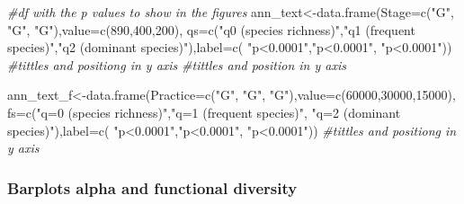\documentclass[]{interact}
\theoremstyle{plain}%
\theoremstyle{definition}
\theoremstyle{remark}
\newenvironment{Shaded}{\begin{snugshade}}{\end{snugshade}}
\newcommand{\AttributeTok}[1]{\textcolor[rgb]{0.77,0.63,0.00}{#1}}
\newcommand{\CommentTok}[1]{\textcolor[rgb]{0.56,0.35,0.01}{\textit{#1}}}
\newcommand{\DecValTok}[1]{\textcolor[rgb]{0.00,0.00,0.81}{#1}}
\newcommand{\FunctionTok}[1]{\textcolor[rgb]{0.00,0.00,0.00}{#1}}
\newcommand{\NormalTok}[1]{#1}
\newcommand{\OtherTok}[1]{\textcolor[rgb]{0.56,0.35,0.01}{#1}}
\newcommand{\StringTok}[1]{\textcolor[rgb]{0.31,0.60,0.02}{#1}}
\begin{document}
\begin{Shaded}
\begin{Highlighting}[]
\CommentTok{\#df with the p values to show in the figures}
\NormalTok{ann\_text}\OtherTok{\textless{}{-}}\FunctionTok{data.frame}\NormalTok{(}\AttributeTok{Stage=}\FunctionTok{c}\NormalTok{(}\StringTok{"G"}\NormalTok{, }\StringTok{"G"}\NormalTok{, }\StringTok{"G"}\NormalTok{),}\AttributeTok{value=}\FunctionTok{c}\NormalTok{(}\DecValTok{890}\NormalTok{,}\DecValTok{400}\NormalTok{,}\DecValTok{200}\NormalTok{),}
     \AttributeTok{qs=}\FunctionTok{c}\NormalTok{(}\StringTok{"q0 (species richness)"}\NormalTok{,}\StringTok{"q1 (frequent species)"}\NormalTok{,}\StringTok{"q2 (dominant species)"}\NormalTok{),}\AttributeTok{label=}\FunctionTok{c}\NormalTok{(}
       \StringTok{"p\textless{}0.0001"}\NormalTok{,}\StringTok{"p\textless{}0.0001"}\NormalTok{, }\StringTok{"p\textless{}0.0001"}\NormalTok{)) }\CommentTok{\#tittles and positiong in y axis}
\CommentTok{\#tittles and position in y axis}


\NormalTok{ann\_text\_f}\OtherTok{\textless{}{-}}\FunctionTok{data.frame}\NormalTok{(}\AttributeTok{Practice=}\FunctionTok{c}\NormalTok{(}\StringTok{"G"}\NormalTok{, }\StringTok{"G"}\NormalTok{, }\StringTok{"G"}\NormalTok{),}\AttributeTok{value=}\FunctionTok{c}\NormalTok{(}\DecValTok{60000}\NormalTok{,}\DecValTok{30000}\NormalTok{,}\DecValTok{15000}\NormalTok{),}
                       \AttributeTok{fs=}\FunctionTok{c}\NormalTok{(}\StringTok{"q=0 (species richness)"}\NormalTok{,}\StringTok{"q=1 (frequent species)"}\NormalTok{,}
                            \StringTok{"q=2 (dominant species)"}\NormalTok{),}\AttributeTok{label=}\FunctionTok{c}\NormalTok{(}
                              \StringTok{"p\textless{}0.0001"}\NormalTok{,}\StringTok{"p\textless{}0.0001"}\NormalTok{, }\StringTok{"p\textless{}0.0001"}\NormalTok{))}
\CommentTok{\#tittles and positiong in y axis}
\end{Highlighting}
\end{Shaded}

\hypertarget{barplots-alpha-and-functional-diversity-2}{%
\subsubsection{Barplots alpha and functional
diversity}\label{barplots-alpha-and-functional-diversity-2}}
\end{document}
